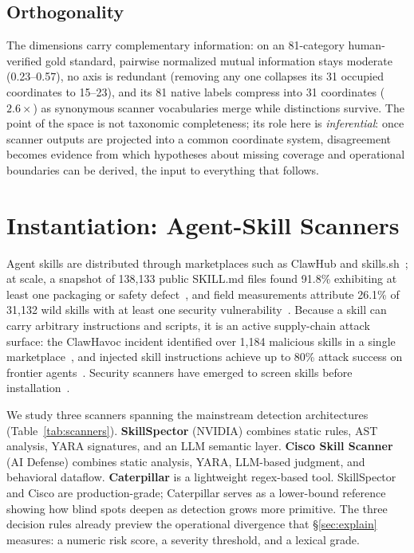 \documentclass[sigconf,nonacm]{acmart}
\begin{document}
\subsection{Orthogonality}
The dimensions carry complementary information: on an 81-category human-verified gold standard, pairwise normalized mutual information stays moderate (0.23--0.57), no axis is redundant (removing any one collapses its 31 occupied coordinates to 15--23), and its 81 native labels compress into 31 coordinates ($2.6\times$) as synonymous scanner vocabularies merge while distinctions survive. The point of the space is not taxonomic completeness; its role here is \emph{inferential}: once scanner outputs are projected into a common coordinate system, disagreement becomes evidence from which hypotheses about missing coverage and operational boundaries can be derived, the input to everything that follows.

\section{Instantiation: Agent-Skill Scanners}
\label{sec:background}

Agent skills are distributed through marketplaces such as ClawHub and skills.sh~\cite{clawhub2026}; at scale, a snapshot of 138{,}133 public SKILL.md files found 91.8\% exhibiting at least one packaging or safety defect~\cite{reusability2026}, and field measurements attribute 26.1\% of 31{,}132 wild skills with at least one security vulnerability~\cite{skillscan2026}. Because a skill can carry arbitrary instructions and scripts, it is an active supply-chain attack surface: the ClawHavoc incident identified over 1{,}184 malicious skills in a single marketplace~\cite{clawhub2026}, and injected skill instructions achieve up to 80\% attack success on frontier agents~\cite{skillinject2026}. Security scanners have emerged to screen skills before installation~\cite{locatejudge2026}.

We study three scanners spanning the mainstream detection architectures (Table~\ref{tab:scanners}). \textbf{SkillSpector} (NVIDIA) combines static rules, AST analysis, YARA signatures, and an LLM semantic layer. \textbf{Cisco Skill Scanner} (AI Defense) combines static analysis, YARA, LLM-based judgment, and behavioral dataflow. \textbf{Caterpillar} is a lightweight regex-based tool. SkillSpector and Cisco are production-grade; Caterpillar serves as a lower-bound reference showing how blind spots deepen as detection grows more primitive. The three decision rules already preview the operational divergence that \S\ref{sec:explain} measures: a numeric risk score, a severity threshold, and a lexical grade.
\end{document}
